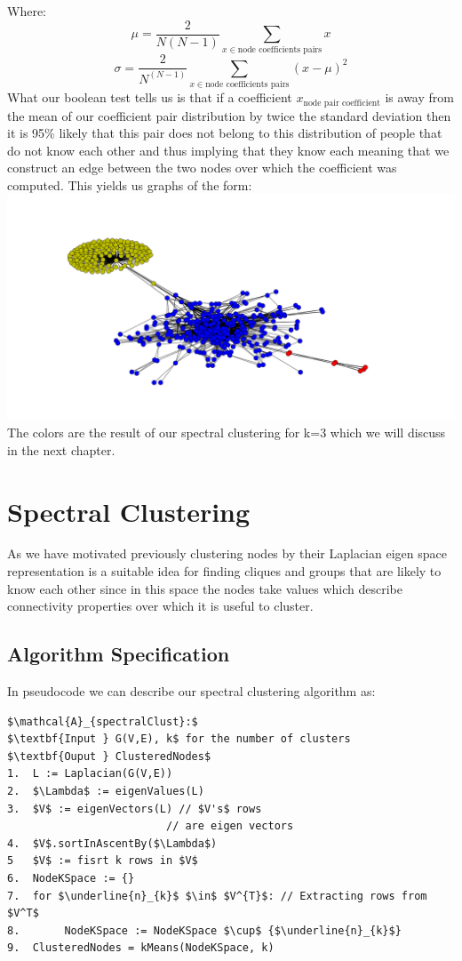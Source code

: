 \documentclass[10pt,twocolumn]{article}
\begin{document}
Where: $$\mu = \frac{2}{N(N-1)}\sum_{x \in \text{node coefficients pairs} } x$$  $$\sigma = \frac{2}{N^(N-1)}\sum_{x \in \text{node coefficients pairs} } (x- \mu)^{2}$$
What our boolean test tells us is that if a coefficient $x_{\text{node pair coefficient}}$ is away from the mean of our coefficient pair distribution by twice the standard deviation then it is 95\%  likely that this pair does not belong to this distribution of people that do not know each other and thus implying that they know each meaning that we construct an edge between the two nodes over which the coefficient was computed. This yields us graphs of the form:
\hspace*{-2cm}
\includegraphics[scale=0.2]{pics/spring.png}
The colors are the result of our spectral clustering
for k=3 which we will discuss in the next chapter.
\section{Spectral Clustering}
As we have motivated previously clustering nodes by their Laplacian eigen space representation is a suitable idea for finding cliques and groups that are likely to know each other since in this space the nodes take values which describe connectivity properties over which it is useful to cluster.
\subsection{Algorithm Specification}
In pseudocode we can describe our spectral clustering algorithm as:
\begin{lstlisting}[mathescape]
$\mathcal{A}_{spectralClust}:$
$\textbf{Input } G(V,E), k$ for the number of clusters
$\textbf{Ouput } ClusteredNodes$
1.  L := Laplacian(G(V,E))
2.  $\Lambda$ := eigenValues(L)
3.  $V$ := eigenVectors(L) // $V's$ rows
                         // are eigen vectors
4.  $V$.sortInAscentBy($\Lambda$)
5   $V$ := fisrt k rows in $V$
6.  NodeKSpace := {}
7.  for $\underline{n}_{k}$ $\in$ $V^{T}$: // Extracting rows from $V^T$
8.       NodeKSpace := NodeKSpace $\cup$ {$\underline{n}_{k}$}
9.  ClusteredNodes = kMeans(NodeKSpace, k)
\end{lstlisting}
\end{document}

